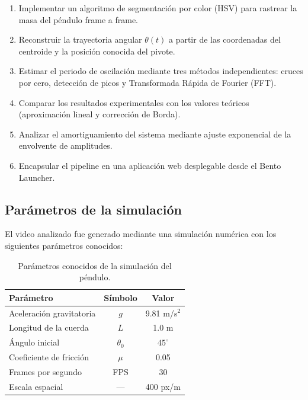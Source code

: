 \documentclass[12pt,a4paper]{article}
\begin{document}
\begin{enumerate}[label=\textbf{\arabic*.}]
    \item Implementar un algoritmo de segmentación por color (HSV) para rastrear la masa del péndulo frame a frame.
    \item Reconstruir la trayectoria angular $\theta(t)$ a partir de las coordenadas del centroide y la posición conocida del pivote.
    \item Estimar el periodo de oscilación mediante tres métodos independientes: cruces por cero, detección de picos y Transformada Rápida de Fourier (FFT).
    \item Comparar los resultados experimentales con los valores teóricos (aproximación lineal y corrección de Borda).
    \item Analizar el amortiguamiento del sistema mediante ajuste exponencial de la envolvente de amplitudes.
    \item Encapsular el pipeline en una aplicación web desplegable desde el Bento Launcher.
\end{enumerate}

\subsection{Parámetros de la simulación}

El video analizado fue generado mediante una simulación numérica con los siguientes parámetros conocidos:

\begin{table}[H]
    \centering
    \begin{tabular}{lcc}
        \toprule
        \textbf{Parámetro} & \textbf{Símbolo} & \textbf{Valor} \\
        \midrule
        Aceleración gravitatoria & $g$ & 9.81 m/s$^2$ \\
        Longitud de la cuerda & $L$ & 1.0 m \\
        Ángulo inicial & $\theta_0$ & $45^{\circ}$ \\
        Coeficiente de fricción & $\mu$ & 0.05 \\
        Frames por segundo & FPS & 30 \\
        Escala espacial & --- & 400 px/m \\
        \bottomrule
    \end{tabular}
    \caption{Parámetros conocidos de la simulación del péndulo.}
    \label{tab:params}
\end{table}
\end{document}
